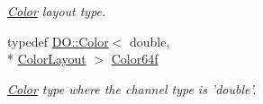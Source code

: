 \begin{DoxyCompactItemize}
\begin{DoxyCompactList}\small\item\em \hyperlink{class_d_o_1_1_color}{Color} layout type. \end{DoxyCompactList}\item 
\hypertarget{struct_d_o_1_1_color_traits_acb6a3ad1b3c0fd4f07d65dfc4fb89623}{typedef \hyperlink{class_d_o_1_1_color}{D\-O\-::\-Color}$<$ double, \\*
\hyperlink{struct_d_o_1_1_color_traits_a1936ea193f7f09f57144dd97e0fd7969}{Color\-Layout} $>$ \hyperlink{struct_d_o_1_1_color_traits_acb6a3ad1b3c0fd4f07d65dfc4fb89623}{Color64f}}\label{struct_d_o_1_1_color_traits_acb6a3ad1b3c0fd4f07d65dfc4fb89623}

\begin{DoxyCompactList}\small\item\em \hyperlink{class_d_o_1_1_color}{Color} type where the channel type is 'double'. \end{DoxyCompactList}\end{DoxyCompactItemize}
